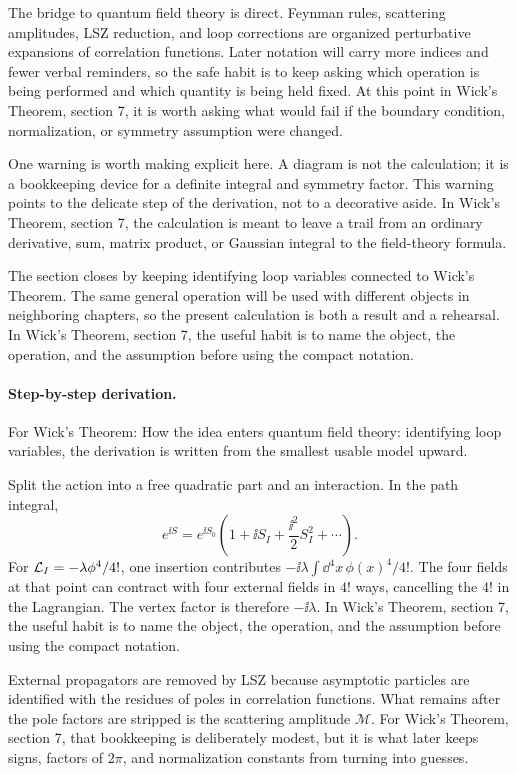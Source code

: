 The bridge to quantum field theory is direct.  Feynman rules, scattering amplitudes, LSZ reduction, and loop corrections are organized perturbative expansions of correlation functions.  Later notation will carry more indices and fewer verbal reminders, so the safe habit is to keep asking which operation is being performed and which quantity is being held fixed.  At this point in Wick's Theorem, section 7, it is worth asking what would fail if the boundary condition, normalization, or symmetry assumption were changed.

One warning is worth making explicit here.  A diagram is not the calculation; it is a bookkeeping device for a definite integral and symmetry factor.  This warning points to the delicate step of the derivation, not to a decorative aside.  In Wick's Theorem, section 7, the calculation is meant to leave a trail from an ordinary derivative, sum, matrix product, or Gaussian integral to the field-theory formula.

The section closes by keeping identifying loop variables connected to Wick's Theorem.  The same general operation will be used with different objects in neighboring chapters, so the present calculation is both a result and a rehearsal.  In Wick's Theorem, section 7, the useful habit is to name the object, the operation, and the assumption before using the compact notation.



\paragraph{Step-by-step derivation.}

For Wick's Theorem: How the idea enters quantum field theory: identifying loop variables, the derivation is written from the smallest usable model upward.

Split the action into a free quadratic part and an interaction.  In the path integral,
\[
  e^{\ii S}=e^{\ii S_0}\left(1+\ii S_I+\frac{\ii^2}{2}S_I^2+\cdots\right).
\]
For \(\mathcal L_I=-\lambda\phi^4/4!\), one insertion contributes \(-\ii\lambda\int\dd^4x\,\phi(x)^4/4!\).  The four fields at that point can contract with four external fields in \(4!\) ways, cancelling the \(4!\) in the Lagrangian.  The vertex factor is therefore \(-\ii\lambda\).  In Wick's Theorem, section 7, the useful habit is to name the object, the operation, and the assumption before using the compact notation.

External propagators are removed by LSZ because asymptotic particles are identified with the residues of poles in correlation functions.  What remains after the pole factors are stripped is the scattering amplitude \(\mathcal M\).  For Wick's Theorem, section 7, that bookkeeping is deliberately modest, but it is what later keeps signs, factors of \(2\pi\), and normalization constants from turning into guesses.

